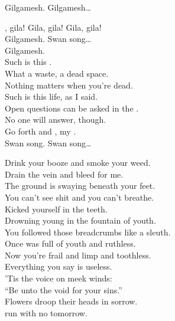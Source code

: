 Gilgamesh. Gilgamesh… \\


, gila! Gila, gila! Gila, gila! \\

Gilgamesh. Swan song… \\

Gilgamesh. \\

Such is this . \\
What a waste, a dead space. \\
Nothing matters when you're dead. \\
Such is this life, as I said. \\
Open questions can be asked in the . \\
No one will answer, though. \\
Go forth and , my . \\

Swan song. Swan song… \\




Drink your booze and smoke your weed. \\
Drain the vein and bleed for me. \\
The ground is swaying beneath your feet. \\
You can't see shit and you can't breathe. \\
Kicked yourself in the teeth. \\

Drowning young in the fountain of youth. \\
You followed those breadcrumbs like a sleuth. \\
Once was full of youth and ruthless. \\
Now you're frail and limp and toothless. \\
Everything you say is useless. \\

'Tis the  voice on meek winds: \\
``Be unto the void for your sins.'' \\
Flowers droop their heads in sorrow. \\
 run with no tomorrow. \\

